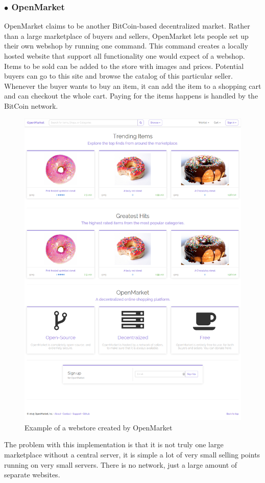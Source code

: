 \subsubsection*{$\bullet$ OpenMarket}
OpenMarket \cite{openmarket} claims to be another BitCoin-based decentralized market.
Rather than a large marketplace of buyers and sellers, OpenMarket lets people set up their own webshop by running one command.
This command creates a locally hosted website that support all functionality one would expect of a webshop.
Items to be sold can be added to the store with images and prices. 
Potential buyers can go to this site and browse the catalog of this particular seller.
Whenever the buyer wants to buy an item, it can add the item to a shopping cart and can checkout the whole cart.
Paying for the items happens is handled by the BitCoin network.
\begin{figure}[H]
  \centering
  \includegraphics[scale=0.2]{openmarket}
  \caption{Example of a webstore created by OpenMarket\cite{opemarketpic}}
  \label{openmarketfig}
\end{figure}
The problem with this implementation is that it is not truly one large marketplace without a central server, it is simple a lot of very small selling points running on very small servers.
There is no network, just a large amount of separate websites.

